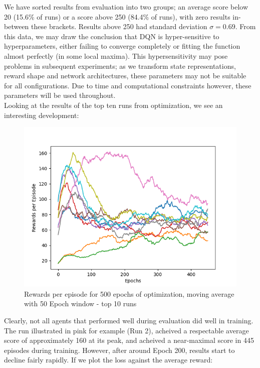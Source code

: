 \documentclass[12pt]{article}
\begin{document}
We have sorted results from evaluation into two groups; an average score below 20 (15.6\% of runs) or a score above 250 (84.4\% of runs), with zero results in-between these brackets. Results above 250 had standard deviation $\sigma = 0.69$. From this data, we may draw the conclusion that DQN is hyper-sensitive to hyperparameters, either failing to converge completely or fitting the function almost perfectly (in some local maxima). This hypersensitivity may pose problems in subsequent experiments; as we transform state representations, reward shape and network architectures, these parameters may not be suitable for all configurations. Due to time and computational constraints however, these parameters will be used throughout. 
\\\newline Looking at the results of the top ten runs from optimization, we see an interesting development:
\begin{figure}[H]
    \centering
    \includegraphics[scale=0.6]{10.png}
    \caption{Rewards per episode for 500 epochs of optimization, moving average with 50 Epoch window - top 10 runs}
    \label{top10}
\end{figure}
Clearly, not all agents that performed well during evaluation did well in training. The run illustrated in pink for example (Run 2), acheived a respectable average score of approximately 160 at its peak, and acheived a near-maximal score in 445 episodes during training. However, after around Epoch 200, results start to decline fairly rapidly. If we plot the loss against the average reward:
\end{document}
